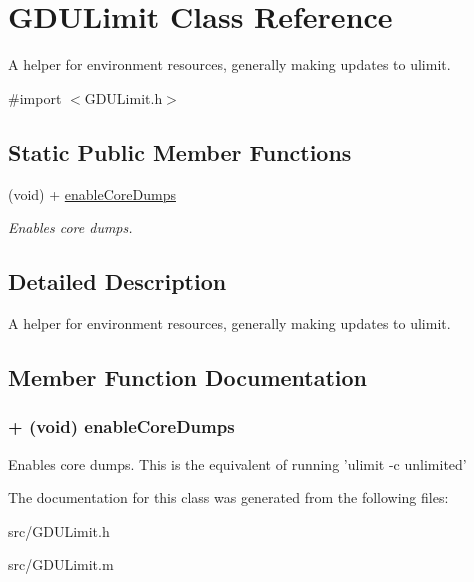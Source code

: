 \hypertarget{interface_g_d_u_limit}{
\section{GDULimit Class Reference}
\label{interface_g_d_u_limit}
}


A helper for environment resources, generally making updates to ulimit.  


{\ttfamily \#import $<$GDULimit.h$>$}\subsection*{Static Public Member Functions}
\begin{DoxyCompactItemize}
\item 
(void) + \hyperlink{interface_g_d_u_limit_ab657cde9b16d4cb6f5b77fd96fe917e0}{enableCoreDumps}
\begin{DoxyCompactList}\small\item\em Enables core dumps. \item\end{DoxyCompactList}\end{DoxyCompactItemize}


\subsection{Detailed Description}
A helper for environment resources, generally making updates to ulimit. 

\subsection{Member Function Documentation}
\hypertarget{interface_g_d_u_limit_ab657cde9b16d4cb6f5b77fd96fe917e0}{
\subsubsection[{enableCoreDumps}]{\setlength{\rightskip}{0pt plus 5cm}+ (void) enableCoreDumps }}
\label{interface_g_d_u_limit_ab657cde9b16d4cb6f5b77fd96fe917e0}


Enables core dumps. This is the equivalent of running 'ulimit -\/c unlimited' 

The documentation for this class was generated from the following files:\begin{DoxyCompactItemize}
\item 
src/GDULimit.h\item 
src/GDULimit.m\end{DoxyCompactItemize}
